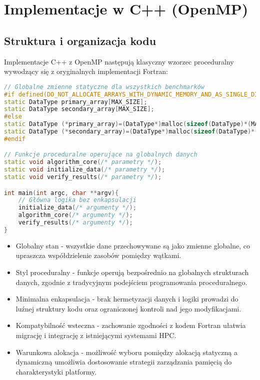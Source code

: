\section{Implementacje w C++ (OpenMP)}
\subsection{Struktura i organizacja kodu}
Implementacje C++ z OpenMP następują klasyczny wzorzec proceduralny wywodzący się z oryginalnych implementacji Fortran:

\begin{lstlisting}[language=C++, caption={Struktura kodu benchmarków w języku C++ z OpenMP}, label={lst:openmp_structure}]
// Globalne zmienne statyczne dla wszystkich benchmarków
#if defined(DO_NOT_ALLOCATE_ARRAYS_WITH_DYNAMIC_MEMORY_AND_AS_SINGLE_DIMENSION)
static DataType primary_array[MAX_SIZE];
static DataType secondary_array[MAX_SIZE];
#else
static DataType (*primary_array)=(DataType*)malloc(sizeof(DataType)*(MAX_SIZE));
static DataType (*secondary_array)=(DataType*)malloc(sizeof(DataType)*(MAX_SIZE));
#endif

// Funkcje proceduralne operujące na globalnych danych
static void algorithm_core(/* parametry */);
static void initialize_data(/* parametry */);
static void verify_results(/* parametry */);

int main(int argc, char **argv){
    // Główna logika bez enkapsulacji
    initialize_data(/* argumenty */);
    algorithm_core(/* argumenty */);
    verify_results(/* argumenty */);
}
\end{lstlisting}
\begin{itemize}
    \item Globalny stan - wszystkie dane przechowywane są jako zmienne globalne, co upraszcza współdzielenie zasobów pomiędzy wątkami.
    
    \item Styl proceduralny - funkcje operują bezpośrednio na globalnych strukturach danych, zgodnie z tradycyjnym podejściem programowania proceduralnego.
    
    \item Minimalna enkapsulacja - brak hermetyzacji danych i logiki prowadzi do luźnej struktury kodu oraz ograniczonej kontroli nad jego modyfikacjami.
    
    \item Kompatybilność wsteczna - zachowanie zgodności z kodem Fortran ułatwia migrację i integrację z istniejącymi systemami HPC.
    
    \item Warunkowa alokacja - możliwość wyboru pomiędzy alokacją statyczną a dynamiczną umożliwia dostosowanie strategii zarządzania pamięcią do charakterystyki platformy.
\end{itemize}
  
